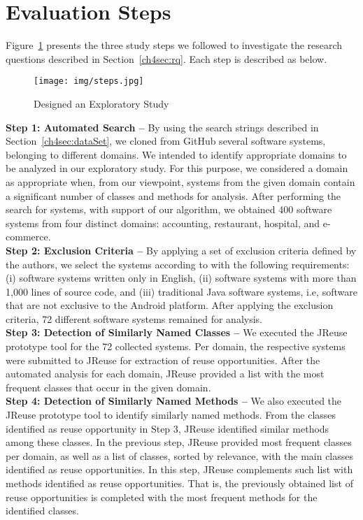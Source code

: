 \section{Evaluation Steps}
\label{ch4sec:evaluationSetup}

Figure~\ref{fig:fig1} presents the three study steps we followed to investigate the research questions described in Section~\ref{ch4sec:rq}. Each step is described as below.
\begin{figure}[!h]
\centering
\texttt{[image: img/steps.jpg]}
\caption{Designed an Exploratory Study}
\label{fig:fig1}
\end{figure} 



\noindent
\textbf{Step 1: Automated Search --} By using the search strings described in Section~\ref{ch4sec:dataSet}, we cloned from GitHub several software systems, belonging to different domains. We intended to identify appropriate domains to be analyzed in our exploratory study. For this purpose, we considered a domain as appropriate when, from our viewpoint, systems from the given domain contain a significant number of classes and methods for analysis. After performing the search for systems, with support of our algorithm, we obtained 400 software systems from four distinct domains: accounting, restaurant, hospital, and e-commerce. \\

\noindent
\textbf{Step 2:  Exclusion Criteria --} By applying a set of exclusion criteria defined by the authors, we select the systems according to with the following requirements: (i) software systems written only in English, (ii) software systems with more than 1,000 lines of source code, and (iii) traditional Java software systems, i.e, software that are not exclusive to the Android platform. After applying the exclusion criteria, 72 different software systems remained for analysis.\\


\noindent
\textbf{Step 3: Detection of Similarly Named Classes --} We executed the JReuse prototype tool for the 72 collected systems. Per domain, the respective systems were submitted to JReuse for extraction of reuse opportunities. After the automated analysis for each domain, JReuse provided a list with the most frequent classes that occur in the given domain. \\


\noindent
\textbf{Step 4: Detection of Similarly Named Methods --} We also executed the JReuse prototype tool  to identify similarly named methods.  From the classes identified as reuse opportunity in Step 3, JReuse identified similar methods among these classes. In the previous step, JReuse provided most frequent classes per domain, as well as a list of classes, sorted by relevance, with the main classes identified as reuse opportunities. In this step, JReuse complements such list with methods identified as reuse opportunities. That is, the previously obtained list of reuse opportunities is completed with the most frequent  methods for the identified classes.


